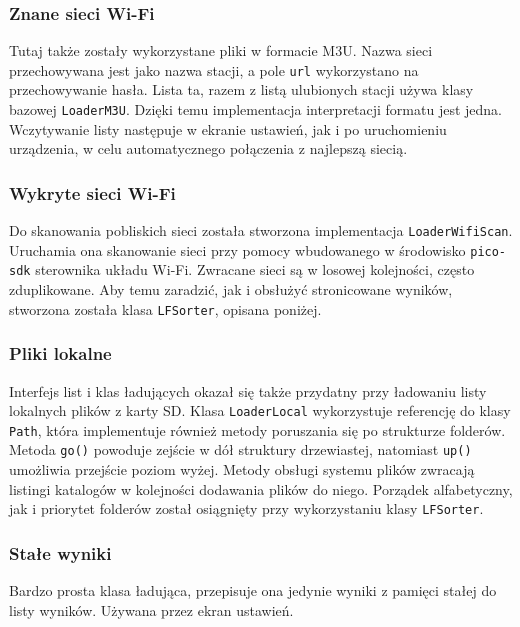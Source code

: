 \documentclass[12pt]{report}
\begin{document}
			\subsubsection{Znane sieci Wi-Fi}
				Tutaj także zostały wykorzystane pliki w formacie M3U. Nazwa sieci przechowywana jest jako nazwa stacji, a pole \lstinline|url| wykorzystano na przechowywanie hasła. Lista ta, razem z listą ulubionych stacji używa klasy bazowej \lstinline|LoaderM3U|. Dzięki temu implementacja interpretacji formatu jest jedna. Wczytywanie listy następuje w ekranie ustawień, jak i po uruchomieniu urządzenia, w celu automatycznego połączenia z najlepszą siecią.
				
			\subsubsection{Wykryte sieci Wi-Fi}
				Do skanowania pobliskich sieci została stworzona implementacja \lstinline|LoaderWifiScan|. Uruchamia ona skanowanie sieci przy pomocy wbudowanego w środowisko \lstinline|pico-sdk| sterownika układu Wi-Fi. Zwracane sieci są w losowej kolejności, często zduplikowane. Aby temu zaradzić, jak i obsłużyć stronicowane wyników, stworzona została klasa \lstinline|LFSorter|, opisana poniżej.
				
			\subsubsection{Pliki lokalne}
				Interfejs list i klas ładujących okazał się także przydatny przy ładowaniu listy lokalnych plików z karty SD. Klasa \lstinline|LoaderLocal| wykorzystuje referencję do klasy \lstinline|Path|, która implementuje również metody poruszania się po strukturze folderów. Metoda \lstinline|go()| powoduje zejście w dół struktury drzewiastej, natomiast \lstinline|up()| umożliwia przejście poziom wyżej. Metody obsługi systemu plików zwracają listingi katalogów w kolejności dodawania plików do niego. Porządek alfabetyczny, jak i priorytet folderów został osiągnięty przy wykorzystaniu klasy \lstinline|LFSorter|.
				
			\subsubsection{Stałe wyniki}
				Bardzo prosta klasa ładująca, przepisuje ona jedynie wyniki z pamięci stałej do listy wyników. Używana przez ekran ustawień.
				
\end{document}
